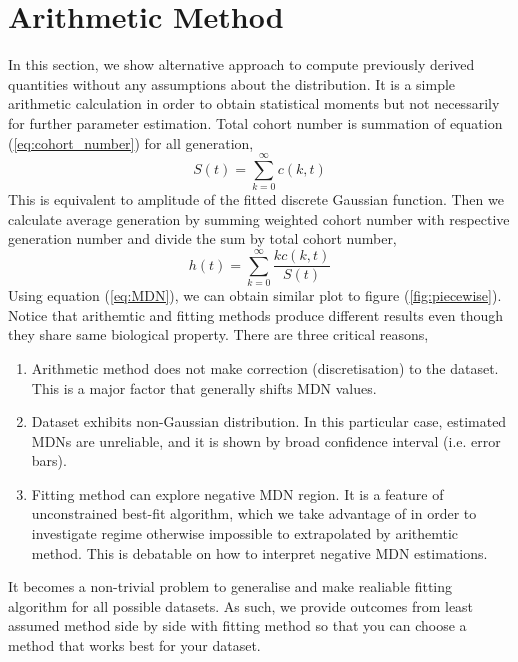 \documentclass{article}
\newcommand{\enterProblemHeader}[1]{
}
\newcommand{\exitProblemHeader}[1]{
}
\newcounter{homeworkProblemCounter} %
\newcommand{\homeworkProblemName}{}
\newenvironment{homeworkProblem}[1][Problem \arabic{homeworkProblemCounter}]{ %
\stepcounter{homeworkProblemCounter} %
\renewcommand{\homeworkProblemName}{#1} %
\section{\homeworkProblemName} %
\enterProblemHeader{\homeworkProblemName} %
}{
\exitProblemHeader{\homeworkProblemName} %
}
\begin{document}
\begin{homeworkProblem}[Arithmetic Method]
In this section, we show alternative approach to compute previously derived quantities without any assumptions about the distribution. It is a simple arithmetic calculation in order to obtain statistical moments but not necessarily for further parameter estimation. Total cohort number is summation of equation (\ref{eq:cohort_number}) for all generation,
\begin{equation}
    S(t) = \sum_{k=0}^{\infty} c(k,t)
        \label{eq:total_cohort}
\end{equation}
This is equivalent to amplitude of the fitted discrete Gaussian function. Then we calculate average generation by summing weighted cohort number with respective generation number and divide the sum by total cohort number,
\begin{equation}
    h(t) = \sum_{k=0}^{\infty} \frac{k c(k,t)}{S(t)}
    \label{eq:MDN}
\end{equation}
Using equation (\ref{eq:MDN}), we can obtain similar plot to figure (\ref{fig:piecewise}). Notice that arithemtic and fitting methods produce different results even though they share same biological property. There are three critical reasons,
\begin{enumerate}
    \item Arithmetic method does not make correction (discretisation) to the dataset. This is a major factor that generally shifts MDN values.
    \item Dataset exhibits non-Gaussian distribution. In this particular case, estimated MDNs are unreliable, and it is shown by broad confidence interval (i.e. error bars).
    \item Fitting method can explore negative MDN region. It is a feature of unconstrained best-fit algorithm, which we take advantage of in order to investigate regime otherwise impossible to extrapolated by arithemtic method. This is debatable on how to interpret negative MDN estimations.
\end{enumerate}
It becomes a non-trivial problem to generalise and make realiable fitting algorithm for all possible datasets. As such, we provide outcomes from least assumed method side by side with fitting method so that you can choose a method that works best for your dataset.


\end{homeworkProblem}
\end{document}

